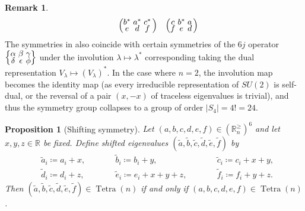 \documentclass[pdflatex, sn-mathphys-num]{sn-jnl} %
\makeatletter
\theoremstyle{plain}
\newtheorem{prop}[thm]{Proposition}
\theoremstyle{definition}
\newtheorem{rem}[thm]{Remark}%
\let\cref\crtcref
\DeclareMathOperator{\Tetra}{Tetra}
\newcommand{\abs}[1]{\left|#1\right|}
\newcommand{\eigs}[1]{\mathbb R^{\geq}_{#1}}
\newcommand{\ea}{a}
\newcommand{\eb}{b}
\newcommand{\ec}{c}
\newcommand{\ed}{d}
\newcommand{\ee}{e}
\newcommand{\ef}{f}
\newcommand{\yx}{\lambda}
\newcommand{\tightsextuple}[1]{
\begingroup
\arraycolsep=1.5pt
\renewcommand{\arraystretch}{0.3}
\begin{array}{@{}cccccc@{}}#1\end{array}
\endgroup
}
\newcommand{\tightcurlysixj}[1]{
\begingroup
\arraycolsep=1.5pt
\renewcommand{\arraystretch}{0.3}
\left\{\!\begin{array}{ccc}
    #1
\end{array}\!\right\}
\endgroup
}
\newcommand{\abcdefsymbol}{\tightcurlysixj{\alpha & \beta & \gamma \\ \delta & \epsilon & \phi}}
\makeatother
\begin{document}
\begin{rem}
\begin{equation}
\begin{alignedat}{3}
            \quad
            &&\left(\tightsextuple{\eb^* & \ea^*  & \ec^* \\ \ee & \ed & \ef}\right)
            \quad
            &&\left(\tightsextuple{\ec & \eb^* & \ea \\ \ef & \ee & \ed}\right)\\
        \end{alignedat}
    \end{equation}
    The symmetries in \cref{prop:tet_symmetry} also coincide with certain symmetries of the $6j$ operator $\abcdefsymbol$ under the involution $\yx \mapsto \yx^{*}$ corresponding taking the dual representation $V_{\yx} \mapsto (V_{\yx})^{*}$.
    In the case where $n = 2$, the involution map becomes the identity map (as every irreducible representation of $SU(2)$ is self-dual, or the reversal of a pair $(x,-x)$ of traceless eigenvalues is trivial), and thus the symmetry group collapses to a group of order $\abs{S_4} = 4! = 24$.
\end{rem}
\begin{prop}[Shifting symmetry]
    \label{prop:shifting}
    Let $(\ea, \eb, \ec, \ed, \ee, \ef) \in (\eigs{n})^{6}$ and let $x,y,z \in \mathbb R$ be fixed.
    Define shifted eigenvalues $(\tilde \ea, \tilde \eb, \tilde \ec, \tilde \ed, \tilde \ee,\tilde \ef)$ by
    \begin{equation}
        \label{eq:shifted_tet_eigenvalues}
        \begin{alignedat}{3}
             &\tilde \ea_i \coloneqq \ea_i + x, \qquad
            &&\tilde \eb_i \coloneqq \eb_i + y, \qquad
            &&\tilde \ec_i \coloneqq \ec_i + x + y, \\
             &\tilde \ed_i \coloneqq \ed_i + z, \qquad
            &&\tilde \ee_i \coloneqq \ee_i + x + y + z, \qquad
            &&\tilde \ef_i \coloneqq \ef_i + y + z.
        \end{alignedat}
    \end{equation}
    Then $(\tilde \ea, \tilde \eb, \tilde \ec, \tilde \ed, \tilde \ee,\tilde \ef) \in \Tetra(n)$ if and only if $(\ea, \eb, \ec, \ed, \ee, \ef) \in \Tetra(n)$.
\end{prop}
\end{document}
